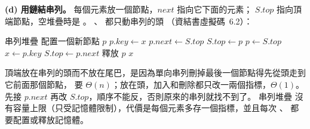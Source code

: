 \begin{pastsoln}
\textbf{(d) 用鏈結串列。} 每個元素放一個節點，$\mathit{next}$ 指向它下面的元素；
$S.\mathit{top}$ 指向頂端節點，空堆疊時是 \NIL。 、 都只動串列的頭
（資結書虛擬碼~6.2）：
\begin{pseudo}{串列堆疊}
    \State 配置一個新節點 $p$
    \State $p.\mathit{key} \gets x$
    \State $p.\mathit{next} \gets S.\mathit{top}$
    \State $S.\mathit{top} \gets p$
\EndProcedure
\Statex
{}
        \State {}
    \EndIf
    \State $p \gets S.\mathit{top}$
    \State $x \gets p.\mathit{key}$
    \State $S.\mathit{top} \gets p.\mathit{next}$
    \State 釋放 $p$
    \State \Return $x$
\EndFunction
\end{pseudo}
頂端放在串列的頭而不放在尾巴，是因為單向串列刪掉最後一個節點得先從頭走到它前面那個節點，
要 $\Theta(n)$；放在頭，加入和刪除都只改一兩個指標，$\Theta(1)$。  先接
$p.\mathit{next}$ 再改 $S.\mathit{top}$，順序不能反，否則原來的串列就找不到了。 串列堆疊
沒有容量上限（只受記憶體限制），代價是每個元素多存一個指標，並且每次 、
 都要配置或釋放記憶體。
\end{pastsoln}
